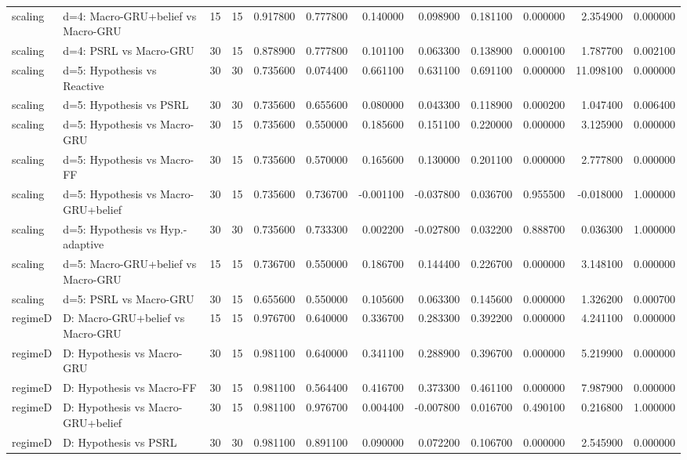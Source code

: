\begin{tabular}{llrrrrrrrrrr}
scaling & d=4: Macro-GRU+belief vs Macro-GRU & 15 & 15 & 0.917800 & 0.777800 & 0.140000 & 0.098900 & 0.181100 & 0.000000 & 2.354900 & 0.000000 \\
scaling & d=4: PSRL vs Macro-GRU & 30 & 15 & 0.878900 & 0.777800 & 0.101100 & 0.063300 & 0.138900 & 0.000100 & 1.787700 & 0.002100 \\
scaling & d=5: Hypothesis vs Reactive & 30 & 30 & 0.735600 & 0.074400 & 0.661100 & 0.631100 & 0.691100 & 0.000000 & 11.098100 & 0.000000 \\
scaling & d=5: Hypothesis vs PSRL & 30 & 30 & 0.735600 & 0.655600 & 0.080000 & 0.043300 & 0.118900 & 0.000200 & 1.047400 & 0.006400 \\
scaling & d=5: Hypothesis vs Macro-GRU & 30 & 15 & 0.735600 & 0.550000 & 0.185600 & 0.151100 & 0.220000 & 0.000000 & 3.125900 & 0.000000 \\
scaling & d=5: Hypothesis vs Macro-FF & 30 & 15 & 0.735600 & 0.570000 & 0.165600 & 0.130000 & 0.201100 & 0.000000 & 2.777800 & 0.000000 \\
scaling & d=5: Hypothesis vs Macro-GRU+belief & 30 & 15 & 0.735600 & 0.736700 & -0.001100 & -0.037800 & 0.036700 & 0.955500 & -0.018000 & 1.000000 \\
scaling & d=5: Hypothesis vs Hyp.-adaptive & 30 & 30 & 0.735600 & 0.733300 & 0.002200 & -0.027800 & 0.032200 & 0.888700 & 0.036300 & 1.000000 \\
scaling & d=5: Macro-GRU+belief vs Macro-GRU & 15 & 15 & 0.736700 & 0.550000 & 0.186700 & 0.144400 & 0.226700 & 0.000000 & 3.148100 & 0.000000 \\
scaling & d=5: PSRL vs Macro-GRU & 30 & 15 & 0.655600 & 0.550000 & 0.105600 & 0.063300 & 0.145600 & 0.000000 & 1.326200 & 0.000700 \\
regimeD & D: Macro-GRU+belief vs Macro-GRU & 15 & 15 & 0.976700 & 0.640000 & 0.336700 & 0.283300 & 0.392200 & 0.000000 & 4.241100 & 0.000000 \\
regimeD & D: Hypothesis vs Macro-GRU & 30 & 15 & 0.981100 & 0.640000 & 0.341100 & 0.288900 & 0.396700 & 0.000000 & 5.219900 & 0.000000 \\
regimeD & D: Hypothesis vs Macro-FF & 30 & 15 & 0.981100 & 0.564400 & 0.416700 & 0.373300 & 0.461100 & 0.000000 & 7.987900 & 0.000000 \\
regimeD & D: Hypothesis vs Macro-GRU+belief & 30 & 15 & 0.981100 & 0.976700 & 0.004400 & -0.007800 & 0.016700 & 0.490100 & 0.216800 & 1.000000 \\
regimeD & D: Hypothesis vs PSRL & 30 & 30 & 0.981100 & 0.891100 & 0.090000 & 0.072200 & 0.106700 & 0.000000 & 2.545900 & 0.000000 \\

\end{tabular}
